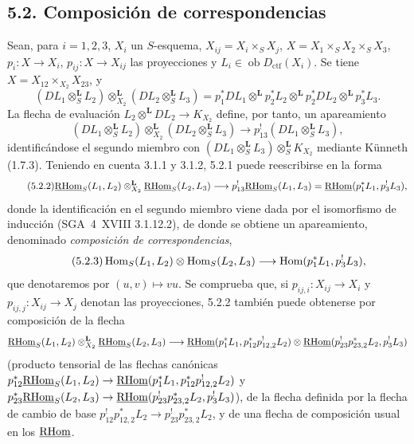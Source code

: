 \subsection*{5.2. Composición de correspondencias}

Sean, para $i=1,2,3$, $X_i$ un $S$-esquema, $X_{ij}=X_i\times_SX_j$, $X=X_1\times_SX_2\times_SX_3$, $p_i:X\to X_i$, $p_{ij}:X\to X_{ij}$ las proyecciones y $L_i\in\operatorname{ob}D_{\mathrm{ctf}}(X_i)$. Se tiene $X=X_{12}\times_{X_2}X_{23}$, y
\[
(DL_1\otimes_S^{\mathbf L}L_2)\otimes_{X_2}^{\mathbf L}(DL_2\otimes_S^{\mathbf L}L_3)
=p_1^*DL_1\otimes^{\mathbf L}p_2^*L_2\otimes^{\mathbf L}p_2^*DL_2\otimes^{\mathbf L}p_3^*L_3.
\]
La flecha de evaluación $L_2\otimes^{\mathbf L}DL_2\to K_{X_2}$ define, por tanto, un apareamiento
\begin{equation}
\tag{5.2.1}
(DL_1\otimes_S^{\mathbf L}L_2)\otimes_{X_2}^{\mathbf L}(DL_2\otimes_S^{\mathbf L}L_3)\longrightarrow p_{13}^!(DL_1\otimes_S^{\mathbf L}L_3),
\end{equation}
identificándose el segundo miembro con $(DL_1\otimes_S^{\mathbf L}L_3)\otimes_S^{\mathbf L}K_{X_2}$ mediante Künneth (1.7.3). Teniendo en cuenta 3.1.1 y 3.1.2, 5.2.1 puede reescribirse en la forma
\begin{equation}
\tag{5.2.2}
\underline{\mathrm{RHom}}_S(L_1,L_2)\otimes_{X_2}^{\mathbf L}\underline{\mathrm{RHom}}_S(L_2,L_3)\longrightarrow p_{13}^!\underline{\mathrm{RHom}}_S(L_1,L_3)=\underline{\mathrm{RHom}}(p_1^*L_1,p_3^!L_3),
\end{equation}
donde la identificación en el segundo miembro viene dada por el isomorfismo de inducción (SGA~4~XVIII 3.1.12.2), de donde se obtiene un apareamiento, denominado \emph{composición de correspondencias},
\begin{equation}
\tag{5.2.3}
\operatorname{Hom}_S(L_1,L_2)\otimes\operatorname{Hom}_S(L_2,L_3)\longrightarrow\operatorname{Hom}(p_1^*L_1,p_3^!L_3),
\end{equation}
que denotaremos por $(u,v)\mapsto vu$. Se comprueba que, si $p_{ij,i}:X_{ij}\to X_i$ y $p_{ij,j}:X_{ij}\to X_j$ denotan las proyecciones, 5.2.2 también puede obtenerse por composición de la flecha
\[
\underline{\mathrm{RHom}}_S(L_1,L_2)\otimes_{X_2}^{\mathbf L}\underline{\mathrm{RHom}}_S(L_2,L_3)
\longrightarrow
\underline{\mathrm{RHom}}(p_1^*L_1,p_{12}^*p_{12,2}^!L_2)
\otimes
\underline{\mathrm{RHom}}(p_{23}^!p_{23,2}^*L_2,p_3^!L_3)
\]
(producto tensorial de las flechas canónicas $p_{12}^*\underline{\mathrm{RHom}}_S(L_1,L_2)\to\underline{\mathrm{RHom}}(p_1^*L_1,p_{12}^*p_{12,2}^!L_2)$ y $p_{23}^*\underline{\mathrm{RHom}}_S(L_2,L_3)\to\underline{\mathrm{RHom}}(p_{23}^!p_{23,2}^*L_2,p_3^!L_3)$), de la flecha definida por la flecha de cambio de base $p_{12}^!p_{12,2}^*L_2\to p_{23}^!p_{23,2}^*L_2$, y de una flecha de composición usual en los $\underline{\mathrm{RHom}}$.

